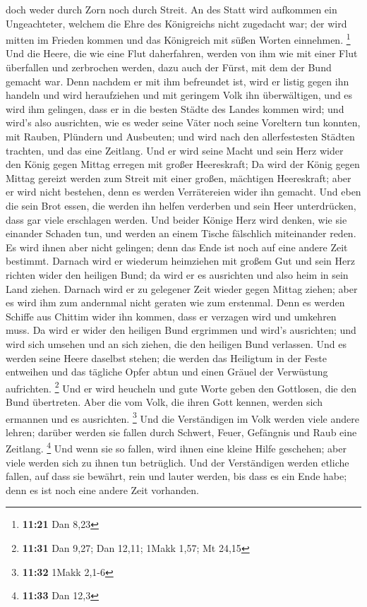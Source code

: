 doch weder durch Zorn noch durch Streit.  An des Statt wird
aufkommen ein Ungeachteter, welchem die Ehre des Königreichs nicht
zugedacht war; der wird mitten im Frieden kommen und das Königreich mit
süßen Worten einnehmen. \footnote{\textbf{11:21} Dan 8,23} 
Und die Heere, die wie eine Flut daherfahren, werden von ihm wie mit
einer Flut überfallen und zerbrochen werden, dazu auch der Fürst, mit
dem der Bund gemacht war.  Denn nachdem er mit ihm
befreundet ist, wird er listig gegen ihn handeln und wird heraufziehen
und mit geringem Volk ihn überwältigen,  und es wird ihm
gelingen, dass er in die besten Städte des Landes kommen wird; und
wird's also ausrichten, wie es weder seine Väter noch seine Voreltern
tun konnten, mit Rauben, Plündern und Ausbeuten; und wird nach den
allerfestesten Städten trachten, und das eine Zeitlang. 
Und er wird seine Macht und sein Herz wider den König gegen Mittag
erregen mit großer Heereskraft; Da wird der König gegen Mittag gereizt
werden zum Streit mit einer großen, mächtigen Heereskraft; aber er wird
nicht bestehen, denn es werden Verrätereien wider ihn gemacht.
 Und eben die sein Brot essen, die werden ihn helfen
verderben und sein Heer unterdrücken, dass gar viele erschlagen werden.
 Und beider Könige Herz wird denken, wie sie einander
Schaden tun, und werden an einem Tische fälschlich miteinander reden. Es
wird ihnen aber nicht gelingen; denn das Ende ist noch auf eine andere
Zeit bestimmt.  Darnach wird er wiederum heimziehen mit
großem Gut und sein Herz richten wider den heiligen Bund; da wird er es
ausrichten und also heim in sein Land ziehen.  Darnach wird
er zu gelegener Zeit wieder gegen Mittag ziehen; aber es wird ihm zum
andernmal nicht geraten wie zum erstenmal.  Denn es werden
Schiffe aus Chittim wider ihn kommen, dass er verzagen wird und umkehren
muss. Da wird er wider den heiligen Bund ergrimmen und wird's
ausrichten; und wird sich umsehen und an sich ziehen, die den heiligen
Bund verlassen.  Und es werden seine Heere daselbst stehen;
die werden das Heiligtum in der Feste entweihen und das tägliche Opfer
abtun und einen Gräuel der Verwüstung aufrichten. \footnote{\textbf{11:31}
  Dan 9,27; Dan 12,11; 1Makk 1,57; Mt 24,15}  Und er wird
heucheln und gute Worte geben den Gottlosen, die den Bund übertreten.
Aber die vom Volk, die ihren Gott kennen, werden sich ermannen und es
ausrichten. \footnote{\textbf{11:32} 1Makk 2,1-6}  Und die
Verständigen im Volk werden viele andere lehren; darüber werden sie
fallen durch Schwert, Feuer, Gefängnis und Raub eine Zeitlang.
\footnote{\textbf{11:33} Dan 12,3}  Und wenn sie so fallen,
wird ihnen eine kleine Hilfe geschehen; aber viele werden sich zu ihnen
tun betrüglich.  Und der Verständigen werden etliche
fallen, auf dass sie bewährt, rein und lauter werden, bis dass es ein
Ende habe; denn es ist noch eine andere Zeit vorhanden.

